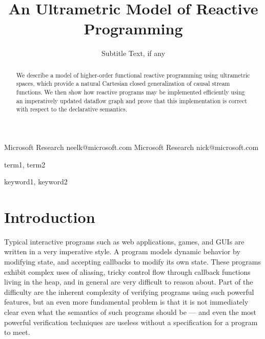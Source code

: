 \documentclass[preprint]{sigplanconf}
\begin{document}
\copyrightdata{[to be supplied]} 


\title{An Ultrametric Model of Reactive Programming}
\subtitle{Subtitle Text, if any}

           {Microsoft Research}
           {neelk@microsoft.com}
           {Microsoft Research}
           {nick@microsoft.com}

\maketitle

\begin{abstract}
We describe a model of higher-order functional reactive programming
using ultrametric spaces, which provide a natural Cartesian closed
generalization of causal stream functions. We then show how reactive
programs may be implemented efficiently using an imperatively updated
dataflow graph and prove that this implementation is correct with
respect to the declarative semantics.
\end{abstract}

\newtheorem{prop}{Proposition}
\newtheorem{lemma}{Lemma}


\terms
term1, term2

\keywords
keyword1, keyword2

\section{Introduction}

Typical interactive programs such as web applications, games, and GUIs
are written in a very imperative style. A program models dynamic
behavior by modifying state, and accepting callbacks to modify its own
state. These programs exhibit complex uses of aliasing, tricky control
flow through callback functions living in the heap, and in general are
very difficult to reason about. Part of the difficulty are the
inherent complexity of verifying programs using such powerful
features, but an even more fundamental problem is that it is not
immediately clear even what the semantics of such programs should be
--- and even the most powerful verification techniques are useless
without a specification for a program to meet.
\end{document}
